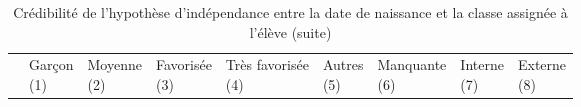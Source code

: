 \documentclass[
]{book}
\begin{document}
\begin{ThreePartTable}
\begin{longtable}[t]{lllllllll}
\midrule
\endfirsthead
\caption[]{\label{tab:ageexoinstagerel}Crédibilité de l'hypothèse d'indépendance entre la date de naissance et la classe assignée à l'élève (suite)}\\
\toprule
 & \makecell{Garçon \\ (1) } & \makecell{Moyenne \\ (2) } & \makecell{Favorisée \\ (3) } & \makecell{Très favorisée \\ (4) } & \makecell{Autres \\ (5) } & \makecell{Manquante \\ (6) } & \makecell{Interne \\ (7) } & \makecell{Externe \\ (8) }\\
\midrule
\endhead


\end{longtable}
\end{ThreePartTable}
\end{document}
